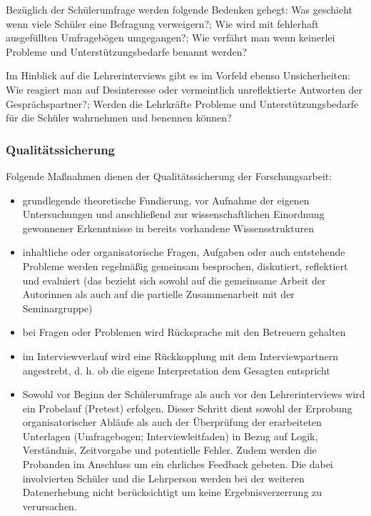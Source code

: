 Bezüglich der Schülerumfrage werden folgende Bedenken gehegt: Was geschieht wenn viele Schüler eine Befragung verweigern?; Wie wird mit fehlerhaft ausgefüllten Umfragebögen umgegangen?; Wie verfährt man wenn keinerlei Probleme und Unterstützungsbedarfe benannt werden?

Im Hinblick auf die Lehrerinterviews gibt es im Vorfeld ebenso Unsicherheiten: Wie reagiert man auf Desinteresse oder vermeintlich unreflektierte Antworten der Gesprächspartner?; Werden die Lehrkräfte Probleme und Unterstützungsbedarfe für die Schüler wahrnehmen und benennen können? 

\subsubsection{Qualitätssicherung}
\label{sec:Qualitätssicherung}

Folgende Maßnahmen dienen der Qualitätssicherung der Forschungsarbeit:
\begin{itemize}
	\item grundlegende theoretische Fundierung, vor Aufnahme der eigenen Untersuchungen und anschließend zur wissenschaftlichen Einordnung gewonnener Erkenntnisse in bereits vorhandene Wissensstrukturen
	\item inhaltliche oder organisatorische Fragen, Aufgaben oder auch entstehende Probleme werden regelmäßig gemeinsam besprochen, diskutiert, reflektiert und evaluiert (das bezieht sich sowohl auf die gemeinsame Arbeit der Autorinnen als auch auf die partielle Zusammenarbeit mit der Seminargruppe)
	\item bei Fragen oder Problemen wird Rücksprache mit den Betreuern gehalten
	\item im Interviewverlauf wird eine Rückkopplung mit dem Interviewpartnern angestrebt, d. h. ob die eigene Interpretation dem Gesagten entspricht
	\item Sowohl vor Beginn der Schülerumfrage als auch vor den Lehrerinterviews wird ein Probelauf (Pretest) erfolgen. Dieser Schritt dient sowohl der Erprobung organisatorischer Abläufe als auch der Überprüfung der erarbeiteten Unterlagen (Umfragebogen; Interviewleitfaden) in Bezug auf Logik, Verständnis, Zeitvorgabe und potentielle Fehler. Zudem werden die Probanden im Anschluss um ein ehrliches Feedback gebeten. Die dabei involvierten Schüler und die Lehrperson werden bei der weiteren Datenerhebung nicht berücksichtigt um keine Ergebnisverzerrung zu verursachen.
\end{itemize}


